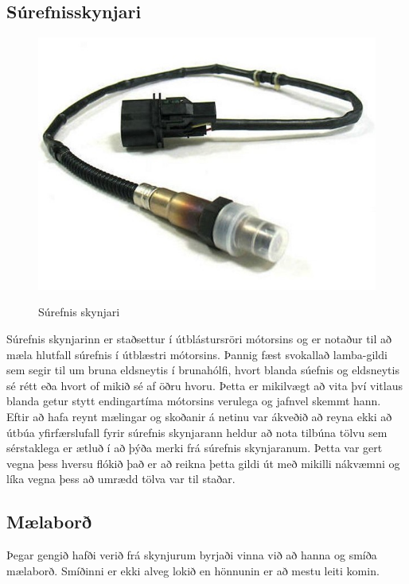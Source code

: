 \documentclass[paper=a4, fontsize=11pt]{scrartcl}
\numberwithin{equation}{section}		%
\numberwithin{figure}{section}			%
\numberwithin{table}{section}				%
\begin{document}
\subsection{Súrefnisskynjari}
\begin{figure}
	\begin{center}
		\includegraphics[]{wideband.jpg}\\
        \caption{Súrefnis skynjari}
	\end{center}
\end{figure}
Súrefnis skynjarinn er staðsettur í útblástursröri mótorsins og er notaður til að mæla hlutfall súrefnis í útblæstri mótorsins. Þannig fæst svokallað lamba-gildi sem segir til um bruna eldsneytis í brunahólfi, hvort blanda súefnis og eldsneytis sé rétt eða hvort of mikið sé af öðru hvoru. Þetta er mikilvægt að vita því vitlaus blanda getur stytt endingartíma mótorsins verulega og jafnvel skemmt hann.\\
Eftir að hafa reynt mælingar og skoðanir á netinu var ákveðið að reyna ekki að útbúa yfirfærslufall fyrir súrefnis skynjarann heldur að nota tilbúna tölvu sem sérstaklega er ætluð í að þýða merki frá súrefnis skynjaranum. Þetta var gert vegna þess hversu flókið það er að reikna þetta gildi út með mikilli nákvæmni og líka vegna þess að umrædd tölva var til staðar.

\subsection{Mælaborð}
Þegar gengið hafði verið frá skynjurum byrjaði vinna við að hanna og smíða mælaborð. Smíðinni er ekki alveg lokið en hönnunin er að mestu leiti komin. 
\end{document}
